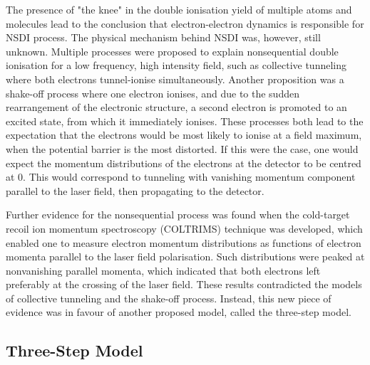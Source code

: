 \documentclass[11pt]{article}
\numberwithin{equation}{section}
\begin{document}
The presence of "the knee" in the double ionisation yield of multiple atoms and molecules lead to the conclusion that electron-electron dynamics is responsible for NSDI process. The physical mechanism behind NSDI was, however, still unknown. Multiple processes were proposed to explain nonsequential double ionisation for a low frequency, high intensity field\cite{tahirshaaran_2011_a}, such as collective tunneling where both electrons tunnel-ionise simultaneously. Another proposition was a shake-off process where one electron ionises, and due to the sudden rearrangement of the electronic structure, a second electron is promoted to an excited state, from which it immediately ionises. These processes both lead to the expectation that the electrons would be most likely to ionise at a field maximum, when the potential barrier is the most distorted. If this were the case, one would expect the momentum distributions of the electrons at the detector to be centred at 0. This would correspond to tunneling with vanishing momentum component parallel to the laser field, then propagating to the detector.
\par
Further evidence for the nonsequential process was found when the cold-target recoil ion momentum spectroscopy (COLTRIMS) technique was developed\cite{ullrich_2003_recoilion}, which enabled one to measure electron momentum distributions as functions of electron momenta parallel to the laser field polarisation\cite{a2011_electronelectron}. Such distributions were peaked at nonvanishing parallel momenta, which indicated that both electrons left preferably at the crossing of the laser field. These results contradicted the models of collective tunneling and the shake-off process. Instead, this new piece of evidence was in favour of another proposed model, called the three-step model.

\subsection{Three-Step Model}\label{ch:TSM}
\end{document}
